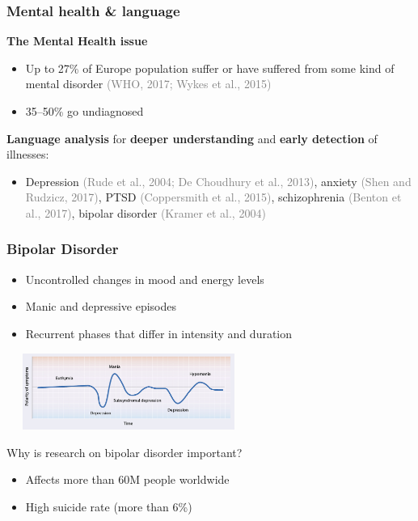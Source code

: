 \documentclass{beamer}
\newcommand{\maybe}[1]{\textcolor{gray}{#1}}
\begin{document}
\begin{frame}
\frametitle{Mental health \& language}
\textbf{The Mental Health issue}
\begin{itemize}
  \item Up to 27\% of Europe population suffer or have suffered from some kind of mental disorder \maybe{(WHO, 2017; Wykes et al., 2015)}
  \item 35--50\% go undiagnosed
\end{itemize}



\textbf{Language analysis} for \textbf{deeper understanding} and \textbf{early detection} of illnesses:
\begin{itemize}
  \item Depression \maybe{(Rude et al., 2004; De Choudhury et al., 2013)}, anxiety \maybe{(Shen and Rudzicz, 2017)}, PTSD \maybe{(Coppersmith et al., 2015)}, schizophrenia \maybe{(Benton et al., 2017)}, bipolar disorder \maybe{(Kramer et al., 2004)}
\end{itemize}
\end{frame}


\begin{frame}
\frametitle{Bipolar Disorder}
\begin{itemize}
  \item Uncontrolled changes in mood and energy levels
  \item Manic and depressive episodes 
  \item Recurrent phases that differ in intensity and duration

\end{itemize}


\begin{center}
\includegraphics[width=8cm,height=2.5cm]{imgs/bipolar-img1.jpg}
\end{center}


Why is research on bipolar disorder important?
\begin{itemize}
  \item Affects more than 60M people worldwide %
  \item High suicide rate (more than 6\%) %
\end{itemize}
\end{frame}
\end{document}
